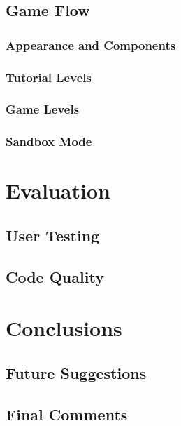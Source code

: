 \documentclass[msc,deptreport, cs]{infthesis}
\begin{document}
\section{Game Flow}

\subsection{Appearance and Components}

\subsection{Tutorial Levels}

\subsection{Game Levels}

\subsection{Sandbox Mode}

\chapter{Evaluation}

\section{User Testing}

\section{Code Quality}

\chapter{Conclusions}

\section{Future Suggestions}

\section{Final Comments}



\end{document}
